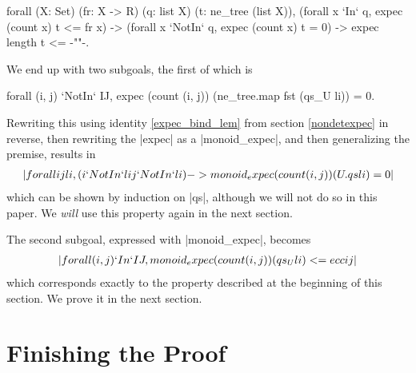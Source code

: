 \documentclass[runningheads]{llncs}
\begin{document}
\begin{code}
  forall (X: Set) (fr: X -> R) (q: list X) (t: ne_tree (list X)),
    (forall x `In` q, expec (count x) t <= fr x) ->
    (forall x `NotIn` q, expec (count x) t = 0) -> expec length t <= {-""-}.
\end{code}
We end up with two subgoals, the first of which is \begin{code}forall (i, j) `NotIn` IJ, expec (count (i, j)) (ne_tree.map fst (qs_U li)) = 0.\end{code} Rewriting this using identity \ref{expec_bind_lem} from section \ref{nondetexpec} in reverse, then rewriting the |expec| as a |monoid_expec|, and then generalizing the premise, results in
\begin{align}
  |forall i j li, (i `NotIn` li \/ j `NotIn` li) -> monoid_expec (count (i, j)) (U.qs li) = 0| \label{monoid_expec_zero_lem}
\end{align}
which can be shown by induction on |qs|, although we will not do so in this paper. 
We \emph{will} use this property again in the next section.

The second subgoal, expressed with |monoid_expec|, becomes
\begin{align}
  |forall (i, j) `In` IJ, monoid_expec (count (i, j)) (qs_U li) <= ecc i j| \label{monoid_expec_IJ_lem}
\end{align}
which corresponds exactly to the property described at the beginning of this section. We prove it in the next section.

\section{Finishing the Proof}
\label{finishing}
\end{document}
